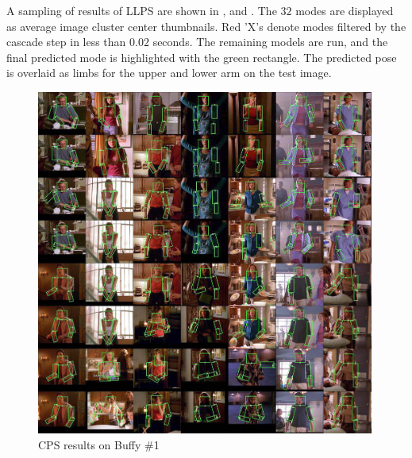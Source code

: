 A sampling of results of LLPS are shown in ,  and 
. The $32$ modes are displayed as average image cluster center 
thumbnails.  Red 'X's denote modes filtered by the cascade step in less than 
$0.02$ seconds.  The remaining models are run, and the final predicted mode is 
highlighted with the green rectangle.  The predicted pose is overlaid as limbs 
for the upper and lower arm on the test image.



\begin{figure}[tb]
\begin{center}
\includegraphics[width=0.99\textwidth]{figs/buffy_test_tiled_cps.jpg}
\caption[CPS results on Buffy \#1]{CPS results on Buffy \#1}
\label{fig:buffy-cps1}
\end{center}
\end{figure}

